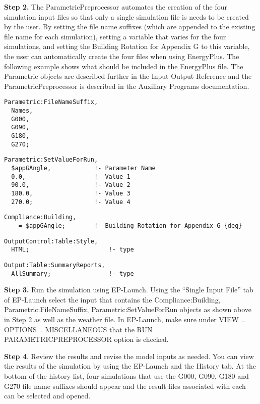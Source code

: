 \textbf{Step 2.} The ParametricPreprocessor automates the creation of the four simulation input files so that only a single simulation file is needs to be created by the user. By setting the file name suffixes (which are appended to the existing file name for each simulation), setting a variable that varies for the four simulations, and setting the Building Rotation for Appendix G to this variable, the user can automatically create the four files when using EnergyPlus. The following example shows what should be included in the EnergyPlus file. The Parametric objects are described further in the Input Output Reference and the ParametricPreprocessor is described in the Auxiliary Programs documentation.

\begin{lstlisting}
Parametric:FileNameSuffix,
  Names,
  G000,
  G090,
  G180,
  G270;
\end{lstlisting}

\begin{lstlisting}
Parametric:SetValueForRun,
  $appGAngle,            !- Parameter Name
  0.0,                   !- Value 1
  90.0,                  !- Value 2
  180.0,                 !- Value 3
  270.0;                 !- Value 4
\end{lstlisting}

\begin{lstlisting}
Compliance:Building,
    = $appGAngle;        !- Building Rotation for Appendix G {deg}
\end{lstlisting}

\begin{lstlisting}
OutputControl:Table:Style,
  HTML;                      !- type
\end{lstlisting}

\begin{lstlisting}
Output:Table:SummaryReports,
  AllSummary;                !- type
\end{lstlisting}

\textbf{Step 3.} Run the simulation using EP-Launch. Using the ``Single Input File'' tab of EP-Launch select the input that contains the Compliance:Building, Parametric:FileNameSuffix, Parametric:SetValueForRun objects as shown above in Step 2 as well as the weather file. In EP-Launch, make sure under VIEW .. OPTIONS .. MISCELLANEOUS that the RUN PARAMETRICPREPROCESSOR option is checked.

\textbf{Step 4}. Review the results and revise the model inputs as needed. You can view the results of the simulation by using the EP-Launch and the History tab. At the bottom of the history list, four simulations that use the G000, G090, G180 and G270 file name suffixes should appear and the result files associated with each can be selected and opened.

